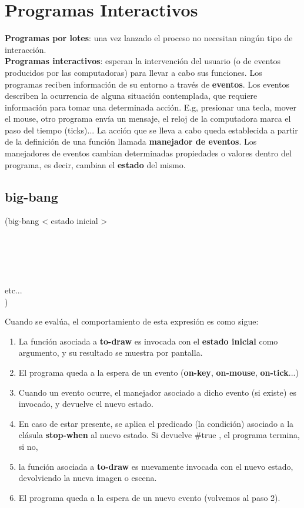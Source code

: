 \documentclass[11pt,a4paper]{article}
\begin{document}
\section{Programas Interactivos}
\textbf{Programas por lotes}: una vez lanzado el proceso no necesitan ningún tipo de interacción.\\
\textbf{Programas interactivos}: esperan la intervención del usuario (o de eventos producidos por las computadoras) para llevar a cabo sus funciones. Los programas reciben información de su entorno a través de \textbf{eventos}. Los eventos describen la ocurrencia de alguna situación contemplada, que requiere información para tomar una determinada acción. E.g, presionar una tecla, mover el mouse, otro programa env\'ia un mensaje, el reloj de la computadora marca el paso del tiempo (ticks)... La acción que se lleva a cabo queda establecida a partir de la definición de una función llamada \textbf{manejador de eventos}. Los manejadores de eventos cambian determinadas propiedades o valores dentro del programa, es decir, cambian el \textbf{estado} del mismo.

\subsection{big-bang}
\begin{siderules}
(big-bang < estado inicial >\\
\indent {}\\
\indent {}\\
\indent {}\\
\indent {}\\
\indent {}\\
\indent \indent etc...\\
\indent \indent )
\end{siderules}

\newpage
Cuando se evalúa, el comportamiento de esta expresión es como sigue:
\begin{enumerate}
\item La función asociada a \textbf{to-draw} es invocada con el \textbf{estado inicial} como argumento, y su resultado se muestra por pantalla.
\item El programa queda a la espera de un evento (\textbf{on-key}, \textbf{on-mouse}, \textbf{on-tick}...)
\item Cuando un evento ocurre, el manejador asociado a dicho evento (si existe) es invocado, y devuelve el nuevo estado.
\item En caso de estar presente, se aplica el predicado (la condición) asociado a la clásula \textbf{stop-when} al nuevo estado. Si devuelve \#true , el programa termina, si no,
\item la función asociada a \textbf{to-draw} es nuevamente invocada con el nuevo estado, devolviendo la nueva imagen o escena.
\item El programa queda a la espera de un nuevo evento (volvemos al paso 2).
\end{enumerate}
\end{document}
